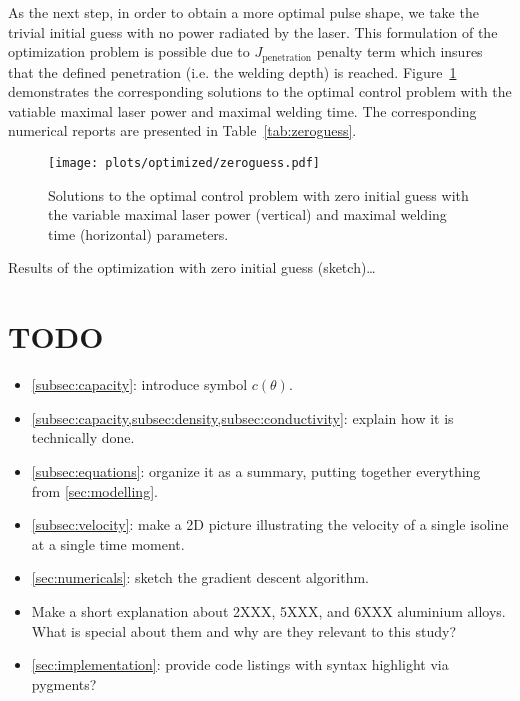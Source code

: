 As the next step, in order to obtain a more optimal pulse shape, we take the trivial initial guess with no power radiated by the laser. This formulation of the optimization problem is possible due to $J_\text{penetration}$ penalty term which insures that the defined penetration (i.e. the welding depth) is reached. Figure~\ref{fig:zeroguess} demonstrates the corresponding solutions to the optimal control problem with the vatiable maximal laser power and maximal welding time. The corresponding numerical reports are presented in Table~\ref{tab:zeroguess}.

\begin{figure} \label{fig:zeroguess}
	\centering
	\texttt{[image: plots/optimized/zeroguess.pdf]}
	\caption{Solutions to the optimal control problem with zero initial guess with the variable maximal laser power (vertical) and maximal welding time (horizontal) parameters.}
\end{figure}

\begin{table} \label{tab:zeroguess}
	\centering
	
	\caption{Results of the optimization with zero initial guess (sketch)\ldots}
\end{table}

\appendix


\section{TODO}
\begin{itemize}
	\item \cref{subsec:capacity}: introduce symbol $c(\theta)$.
	\item \cref{subsec:capacity,subsec:density,subsec:conductivity}: explain how it is technically done.
	\item \cref{subsec:equations}: organize it as a summary, putting together everything from \cref{sec:modelling}.
	\item \cref{subsec:velocity}: make a 2D picture illustrating the velocity of a single isoline at a single time moment.
	\item \cref{sec:numericals}: sketch the gradient descent algorithm.
	\item Make a short explanation about 2XXX, 5XXX, and 6XXX aluminium alloys. What is special about them and why are they relevant to this study?
	\item \cref{sec:implementation}: provide code listings with syntax highlight via pygments?
\end{itemize}
